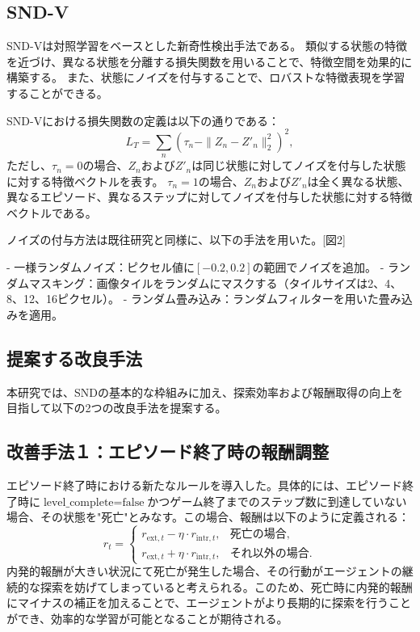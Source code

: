 \subsection{SND-V}
SND-Vは対照学習をベースとした新奇性検出手法である。
類似する状態の特徴を近づけ、異なる状態を分離する損失関数を用いることで、特徴空間を効果的に構築する。
また、状態にノイズを付与することで、ロバストな特徴表現を学習することができる。

SND-Vにおける損失関数の定義は以下の通りである：
\[
 L_T = \sum_{n} (\tau_n - \| Z_n - Z'_n \|_2^2)^2,
\]
ただし、\(\tau_n = 0\)の場合、\(Z_n\)および\(Z'_n\)は同じ状態に対してノイズを付与した状態に対する特徴ベクトルを表す。
\(\tau_n = 1\)の場合、\(Z_n\)および\(Z'_n\)は全く異なる状態、異なるエピソード、異なるステップに対してノイズを付与した状態に対する特徴ベクトルである。

ノイズの付与方法は既往研究と同様に、以下の手法を用いた。[図2]

- 一様ランダムノイズ：ピクセル値に\([-0.2, 0.2]\)の範囲でノイズを追加。
- ランダムマスキング：画像タイルをランダムにマスクする（タイルサイズは2、4、8、12、16ピクセル）。
- ランダム畳み込み：ランダムフィルターを用いた畳み込みを適用。

\subsection{提案する改良手法}
本研究では、SNDの基本的な枠組みに加え、探索効率および報酬取得の向上を目指して以下の2つの改良手法を提案する。

\subsection{改善手法１：エピソード終了時の報酬調整}

エピソード終了時における新たなルールを導入した。具体的には、エピソード終了時に\(\text{level\_complete} = \text{false}\)かつゲーム終了までのステップ数に到達していない場合、その状態を"死亡"とみなす。この場合、報酬は以下のように定義される：
\[
 r_t = \begin{cases}
 r_{\text{ext}, t} - \eta \cdot r_{\text{intr}, t}, & \text{死亡の場合},\\
 r_{\text{ext}, t} + \eta \cdot r_{\text{intr}, t}, & \text{それ以外の場合}.
\end{cases}
\]
内発的報酬が大きい状況にて死亡が発生した場合、その行動がエージェントの継続的な探索を妨げてしまっていると考えられる。このため、死亡時に内発的報酬にマイナスの補正を加えることで、エージェントがより長期的に探索を行うことができ、効率的な学習が可能となることが期待される。


